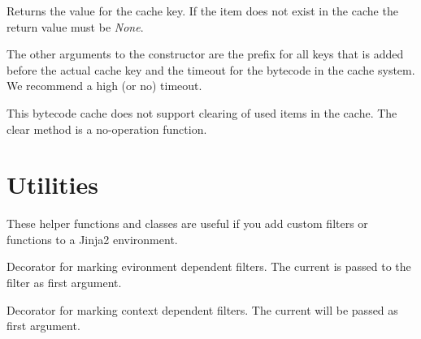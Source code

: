 \documentclass[a4paper,10pt,english]{sphinxmanual}
\begin{document}
\begin{fulllineitems}
\begin{fulllineitems}
\begin{fulllineitems}
\end{fulllineitems}


\begin{fulllineitems}
\label{api:jinja2.MemcachedBytecodeCache.MinimalClientInterface.get}
Returns the value for the cache key.  If the item does not
exist in the cache the return value must be \emph{None}.

\end{fulllineitems}


\end{fulllineitems}


The other arguments to the constructor are the prefix for all keys that
is added before the actual cache key and the timeout for the bytecode in
the cache system.  We recommend a high (or no) timeout.

This bytecode cache does not support clearing of used items in the cache.
The clear method is a no-operation function.

\end{fulllineitems}



\section{Utilities}
\label{api:utilities}
These helper functions and classes are useful if you add custom filters or
functions to a Jinja2 environment.

\begin{fulllineitems}
\label{api:jinja2.environmentfilter}
Decorator for marking evironment dependent filters.  The current
{\hyperref[api:jinja2.Environment]{}} is passed to the filter as first argument.

\end{fulllineitems}


\begin{fulllineitems}
\label{api:jinja2.contextfilter}
Decorator for marking context dependent filters. The current
 will be passed as first argument.

\end{fulllineitems}
\end{document}
